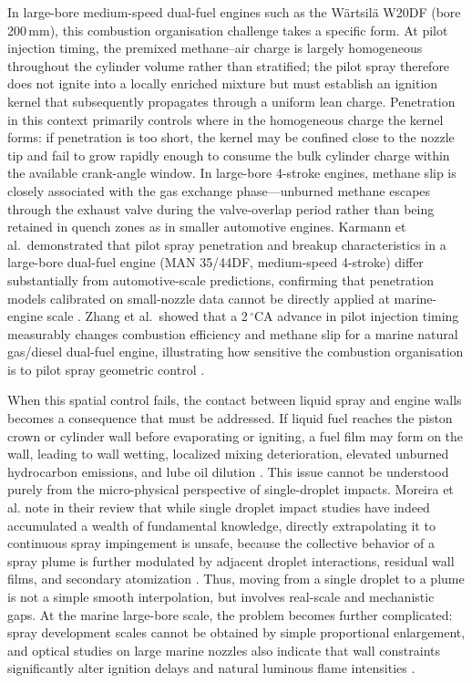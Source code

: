 In large-bore medium-speed dual-fuel engines such as the Wärtsilä W20DF (bore 200\,mm), this combustion organisation challenge takes a specific form.
At pilot injection timing, the premixed methane--air charge is largely homogeneous throughout the cylinder volume rather than stratified; the pilot spray therefore does not ignite into a locally enriched mixture but must establish an ignition kernel that subsequently propagates through a uniform lean charge.
Penetration in this context primarily controls where in the homogeneous charge the kernel forms: if penetration is too short, the kernel may be confined close to the nozzle tip and fail to grow rapidly enough to consume the bulk cylinder charge within the available crank-angle window.
In large-bore 4-stroke engines, methane slip is closely associated with the gas exchange phase---unburned methane escapes through the exhaust valve during the valve-overlap period rather than being retained in quench zones as in smaller automotive engines.
Karmann et al.\ demonstrated that pilot spray penetration and breakup characteristics in a large-bore dual-fuel engine (MAN 35/44DF, medium-speed 4-stroke) differ substantially from automotive-scale predictions, confirming that penetration models calibrated on small-nozzle data cannot be directly applied at marine-engine scale \cite{KarmannDualFuelOptical2023}.
Zhang et al.\ showed that a 2\,$^{\circ}$CA advance in pilot injection timing measurably changes combustion efficiency and methane slip for a marine natural gas/diesel dual-fuel engine, illustrating how sensitive the combustion organisation is to pilot spray geometric control \cite{ZhangPilotTiming2024}.

When this spatial control fails, the contact between liquid spray and engine walls becomes a consequence that must be addressed.
If liquid fuel reaches the piston crown or cylinder wall before evaporating or igniting, a fuel film may form on the wall, leading to wall wetting, localized mixing deterioration, elevated unburned hydrocarbon emissions, and lube oil dilution \cite{peraza2022swi,ahmad2025fueldilution,MorieiraMotaPanao2010}.
This issue cannot be understood purely from the micro-physical perspective of single-droplet impacts.
Moreira et al. note in their review that while single droplet impact studies have indeed accumulated a wealth of fundamental knowledge,
directly extrapolating it to continuous spray impingement is unsafe, because the collective behavior of a spray plume is further modulated by adjacent droplet interactions, residual wall films, and secondary atomization \cite{MorieiraMotaPanao2010}.
Thus, moving from a single droplet to a plume is not a simple smooth interpolation, but involves real-scale and mechanistic gaps.
At the marine large-bore scale, the problem becomes further complicated:
spray development scales cannot be obtained by simple proportional enlargement, and optical studies on large marine nozzles also indicate that wall constraints significantly alter ignition delays and natural luminous flame intensities \cite{liu2024marine_impingement}.

